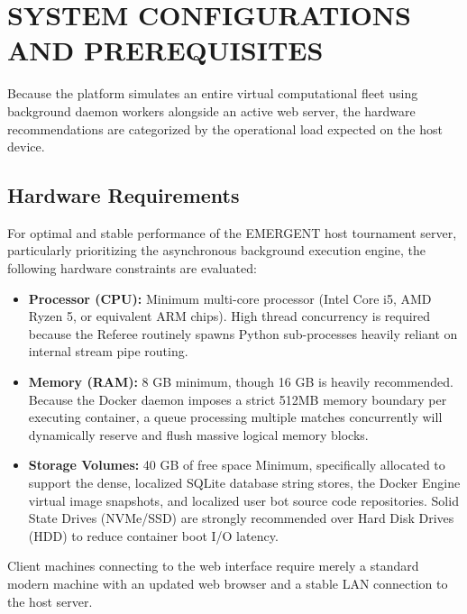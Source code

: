 \documentclass[12pt,a4paper]{report}
\begin{document}
\section{SYSTEM CONFIGURATIONS AND PREREQUISITES}
Because the platform simulates an entire virtual computational fleet using background daemon workers alongside an active web server, the hardware recommendations are categorized by the operational load expected on the host device.

\subsection{Hardware Requirements}
For optimal and stable performance of the EMERGENT host tournament server, particularly prioritizing the asynchronous background execution engine, the following hardware constraints are evaluated:
\begin{itemize}
    \item \textbf{Processor (CPU):} Minimum multi-core processor (Intel Core i5, AMD Ryzen 5, or equivalent ARM chips). High thread concurrency is required because the Referee routinely spawns Python sub-processes heavily reliant on internal stream pipe routing.
    \item \textbf{Memory (RAM):} 8 GB minimum, though 16 GB is heavily recommended. Because the Docker daemon imposes a strict 512MB memory boundary per executing container, a queue processing multiple matches concurrently will dynamically reserve and flush massive logical memory blocks.
    \item \textbf{Storage Volumes:} 40 GB of free space Minimum, specifically allocated to support the dense, localized SQLite database string stores, the Docker Engine virtual image snapshots, and localized user bot source code repositories. Solid State Drives (NVMe/SSD) are strongly recommended over Hard Disk Drives (HDD) to reduce container boot I/O latency.
\end{itemize}

Client machines connecting to the web interface require merely a standard modern machine with an updated web browser and a stable LAN connection to the host server.
\end{document}
